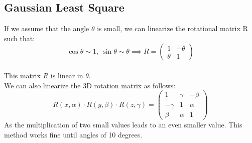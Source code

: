 \documentclass{exerciseBlue}
\begin{document}
\subsection{Gaussian Least Square}
If we assume that the angle $\theta$ is small, we can linearize the rotational matrix R such that:
$$\cos \theta \sim 1, \ \sin \theta \sim \theta \implies R = \begin{pmatrix}
1 & -\theta\\
\theta & 1
\end{pmatrix}$$\\
This matrix $R$ is linear in $\theta$.\\
We can also linearize the 3D rotation matrix as follows:
$$R(x,\alpha)\cdot R(y,\beta)\cdot R(z,\gamma) = \begin{pmatrix}
1 & \gamma & -\beta\\
-\gamma & 1 & \alpha\\
\beta & \alpha & 1
\end{pmatrix}$$
As the multiplication of two small values leads to an even smaller value. This method works fine until angles of 10 degrees.
\end{document}
